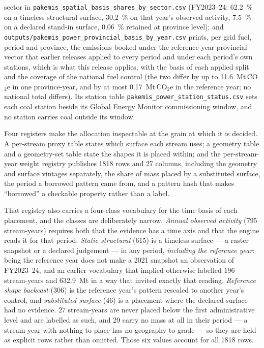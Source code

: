 \documentclass[essd]{copernicus}
\begin{document}
sector in \texttt{pakemis\_spatial\_basis\_shares\_by\_sector.csv} (FY2023--24: \SI{62.2}{\percent} on a timeless structural surface, \SI{30.2}{\percent} on that year's observed activity, \SI{7.5}{\percent} on a declared stand-in surface, \SI{0.06}{\percent} retained at province level); and \texttt{outputs/pakemis\_power\_provincial\_basis\_by\_year.csv} prints, per grid fuel, period and province, the emissions booked under the reference-year provincial vector that earlier releases applied to every period and under each period's own stations, which is what this release applies, with the basis of each applied split and the coverage of the national fuel control (the two differ by up to \SI{11.6}{\mega\tonne}\,CO$_2$e in one province-year, and by at most \SI{0.17}{\mega\tonne}\,CO$_2$e in the reference year; no national total differs). Its station table \texttt{pakemis\_power\_station\_status.csv} sets each coal station beside its Global Energy Monitor commissioning window, and no station carries coal outside its window.

Four registers make the allocation inspectable at the grain at which it is decided. A per-stream proxy table states which surface each stream uses; a geometry table and a geometry-set table state the shapes it is placed within; and the per-stream-year weight registry publishes 1818 rows and 27 columns, including the geometry and surface vintages separately, the share of mass placed by a substituted surface, the period a borrowed pattern came from, and a pattern hash that makes ``borrowed'' a checkable property rather than a label.

That registry also carries a four-class vocabulary for the time basis of each placement, and the classes are deliberately narrow. \emph{Annual observed activity} (795 stream-years) requires both that the evidence has a time axis and that the engine reads it for that period. \emph{Static structural} (615) is a timeless surface --- a raster snapshot or a declared judgement --- in any period, \emph{including the reference year}: being the reference year does not make a 2021 snapshot an observation of FY2023--24, and an earlier vocabulary that implied otherwise labelled 196 stream-years and \SI{632.9}{\mega\tonne} in a way that invited exactly that reading. \emph{Reference shape backcast} (306) is the reference year's pattern rescaled to another year's control, and \emph{substituted surface} (46) is a placement where the declared surface had no evidence. \num{27} stream-years are never placed below the first administrative level and are labelled as such, and \num{29} carry no mass at all in their period --- a stream-year with nothing to place has no geography to grade --- so they are held as explicit rows rather than omitted. Those six values account for all \num{1818} rows.
\end{document}
